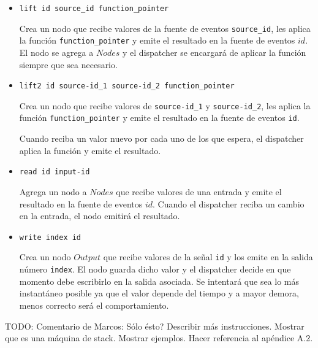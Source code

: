 \begin{itemize}
\item \texttt{lift id source\_id function\_pointer}

 Crea un nodo que recibe valores de la fuente de
 eventos \texttt{source\_id},
 les aplica la función \texttt{function\_pointer} y emite el resultado
 en la fuente de eventos $id$.\\
 El nodo se agrega a $Nodes$ y el dispatcher se encargará de aplicar
 la función siempre que sea necesario.

\item \texttt{lift2 id source-id\_1 source-id\_2 function\_pointer}

  Crea un nodo que recibe valores de \texttt{source-id\_1} y
\texttt{source-id\_2}, les aplica la función \texttt{function\_pointer} 
y emite el resultado en la fuente de eventos \texttt{id}.

  Cuando reciba un valor nuevo por cada uno de los que espera, el
dispatcher aplica la función y emite el resultado.

\item \texttt{read id input-id}

 Agrega un nodo a $Nodes$ que recibe valores de una entrada
 y emite el resultado en la fuente de eventos $id$.
 Cuando el dispatcher reciba un cambio en la entrada, el nodo emitirá
 el resultado.

\item \texttt{write index id}

  Crea un nodo $Output$ que recibe valores de la señal \texttt{id}
y los emite en la salida número \texttt{index}.
  El nodo guarda dicho valor y el dispatcher decide en que momento
debe escribirlo en la salida asociada.
  Se intentará que sea lo más instantáneo posible
ya que el valor depende del tiempo y a mayor demora, menos correcto
será el comportamiento.

\end{itemize}

TODO: Comentario de Marcos: Sólo ésto? Describir más instrucciones.
Mostrar que es una máquina de stack. Mostrar ejemplos. 
Hacer referencia al apéndice A.2.


\pagebreak

